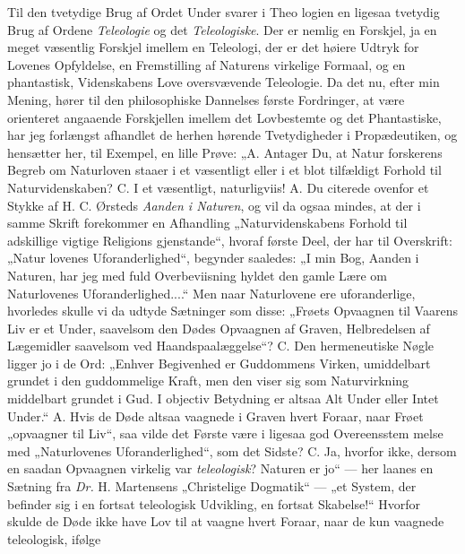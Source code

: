 \documentclass[12pt,a4paper]{article}
\newcommand{\opage}[1]{\marginnote{\footnotesize\textit{[#1]}}}
\begin{document}
Til den tvetydige Brug af Ordet Under svarer i Theo\-%
logien en ligesaa tvetydig Brug af Ordene \emph{Teleologie} og
det \emph{Teleologiske}. Der er nemlig en Forskjel, ja en meget
væsentlig Forskjel imellem en Teleologi, der er det høiere
Udtryk for Lovenes Opfyldelse, en Fremstilling af Naturens
virkelige Formaal, og en phantastisk, Videnskabens Love
oversvævende Teleologie. Da det nu, efter min Mening,
hører til den philosophiske Dannelses første Fordringer, at
\opage{4}\setcounter{footnote}{0}%
være orienteret angaaende Forskjellen imellem det Lovbestemte
og det Phantastiske, har jeg forlængst afhandlet de herhen
hørende Tvetydigheder i Propædeutiken, og hensætter her,
til Exempel, en lille Prøve: „A. Antager Du, at Natur\-%
forskerens Begreb om Naturloven staaer i et væsentligt eller
i et blot tilfældigt Forhold til Naturvidenskaben? C. I et
væsentligt, naturligviis! A. Du citerede ovenfor et Stykke
af H. C. Ørsteds \emph{Aanden i Naturen}, og vil da ogsaa%
mindes, at der i samme Skrift forekommer en Afhandling
„Naturvidenskabens Forhold til adskillige vigtige Religions\-%
gjenstande“, hvoraf første Deel, der har til Overskrift: „Natur\-%
lovenes Uforanderlighed“, begynder saaledes: „I min Bog,
Aanden i Naturen, har jeg med fuld Overbeviisning hyldet
den gamle Lære om Naturlovenes Uforanderlighed....“ Men
naar Naturlovene ere uforanderlige, hvorledes skulle vi da
udtyde Sætninger som disse: „Frøets Opvaagnen til Vaarens
Liv er et Under, saavelsom den Dødes Opvaagnen af Graven,
Helbredelsen af Lægemidler saavelsom ved Haandspaalæggelse“?
C. Den hermeneutiske Nøgle ligger jo i de Ord: „Enhver
Begivenhed er Guddommens Virken, umiddelbart grundet i
den guddommelige Kraft, men den viser sig som Naturvirkning
middelbart grundet i Gud. I objectiv Betydning er altsaa
Alt Under eller Intet Under.“ A. Hvis de Døde altsaa
vaagnede i Graven hvert Foraar, naar Frøet „opvaagner til%
Liv“, saa vilde det Første være i ligesaa god Overeensstem\-%
melse med „Naturlovenes Uforanderlighed“, som det Sidste?
C. Ja, hvorfor ikke, dersom en saadan Opvaagnen virkelig
var \emph{teleologisk}? Naturen er jo“ --- her laanes en Sætning
fra \textit{Dr.} H. Martensens „Christelige Dogmatik“ --- „et System,
der befinder sig i en fortsat teleologisk Udvikling, en fortsat
Skabelse!“ Hvorfor skulde de Døde ikke have Lov til at
vaagne hvert Foraar, naar de kun vaagnede teleologisk, ifølge
\end{document}
